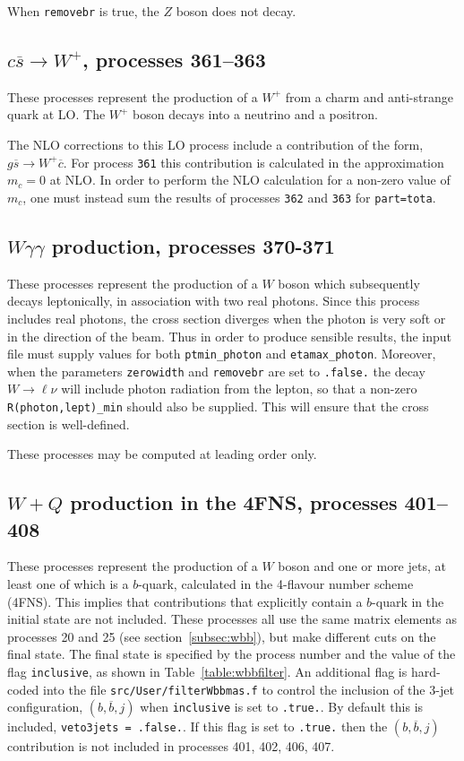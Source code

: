When {\tt removebr} is true, the $Z$ boson does not decay.

\subsection{$c \overline s \to W^+$, processes 361--363}
\label{subsec:csbar}
These processes represent the production of a $W^+$ from a charm and anti-strange
quark at LO. The $W^+$ boson decays into a neutrino and a positron.

The NLO corrections to this LO process include a contribution of the form,
$g\overline s \to W^+ \overline c$. For process {\tt 361} this contribution is
calculated in the approximation $m_c=0$ at NLO. In order to perform the NLO calculation 
for a non-zero value of $m_c$, one must instead sum the results of processes {\tt 362}
and {\tt 363} for {\tt part=tota}.

\subsection{$W\gamma\gamma$ production, processes 370-371}
\label{subsec:wgamgam}

These processes represent the production of a $W$ boson which subsequently
decays leptonically, in association with two real photons.
Since this process includes real photons, the cross section diverges
when the photon is very soft or in the direction of the beam.
Thus in order to produce sensible results, the input file must supply values for both
{\tt ptmin\_photon} and {\tt etamax\_photon}. Moreover, when the parameters {\tt zerowidth}
and {\tt removebr} are set to {\tt .false.} the decay $W \to \ell \nu$ will include
photon radiation from the lepton, so that a non-zero {\tt R(photon,lept)\_min} should
also be supplied. This will ensure that the cross section is well-defined.

These processes may be computed at leading order only.

\subsection{$W+Q$ production in the 4FNS, processes 401--408}
\label{subsec:wbbfilter}
These processes represent the production of a $W$ boson and one or more jets,
at least one of which is a $b$-quark, calculated in the 4-flavour number scheme (4FNS). 
This implies that contributions that explicitly contain a $b$-quark in the initial state
are not included.
These processes all use the same matrix
elements as processes 20 and 25 (see section~\ref{subsec:wbb}), but make different
cuts on the final state. The final state is specified by the process number and
the value of the flag {\tt inclusive}, as shown in Table~\ref{table:wbbfilter}.
An additional flag is hard-coded into the file {\tt src/User/filterWbbmas.f} to control
the inclusion of the 3-jet configuration, $(b,\overline b,j)$ when {\tt inclusive} is set to {\tt .true.}.
By default this is included, {\tt veto3jets = .false.}. If this flag is set to {\tt .true.} 
then the $(b,\overline b,j)$ contribution
is not included in processes 401, 402, 406, 407.

